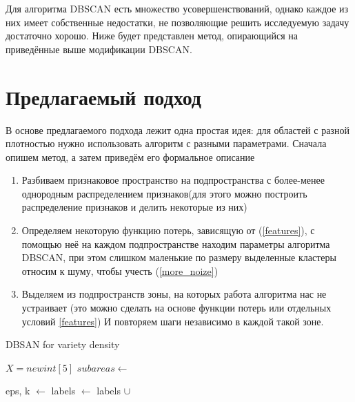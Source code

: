 \documentclass[12pt,fleqn]{article}
\begin{document}
Для алгоритма DBSCAN есть множество усовершенствований, однако каждое из них имеет собственные недостатки, не позволяющие решить исследуемую задачу достаточно хорошо. Ниже будет представлен метод, опирающийся на приведённые выше модификации  DBSCAN.

\section{Предлагаемый подход}
В основе предлагаемого подхода лежит одна простая идея: для областей с разной плотностью нужно использовать алгоритм с разными параметрами. Сначала опишем метод, а затем приведём его формальное описание
\begin{enumerate} 
    \item Разбиваем признаковое пространство на подпространства с более-менее однородным распределением признаков(для этого можно построить распределение признаков и делить некоторые из них) 
    \item  Определяем некоторую функцию потерь, зависящую от (\ref{features}), с помощью неё на каждом подпространстве находим параметры алгоритма DBSCAN, при этом слишком маленькие по размеру выделенные кластеры относим к шуму, чтобы учесть (\ref{more_noize})
    \item Выделяем из подпространств зоны, на которых работа алгоритма нас не устраивает (это можно сделать на основе функции потерь или отдельных условий \ref{features}) И повторяем шаги независимо в каждой такой зоне.
\end{enumerate} 

\newpage

\begin{algorithm}
\caption{DBSAN for variety density}\label{alg:Example}
\begin{algorithmic}
\State $X=newint[5]$
\State $subareas \gets$ 
\EndFunction





    \State eps, k  $\gets$ 
    \State labels $\gets$ labels $\cup$ 

\EndFor
\EndFunction

\end{algorithmic}
\end{algorithm}
\end{document}
